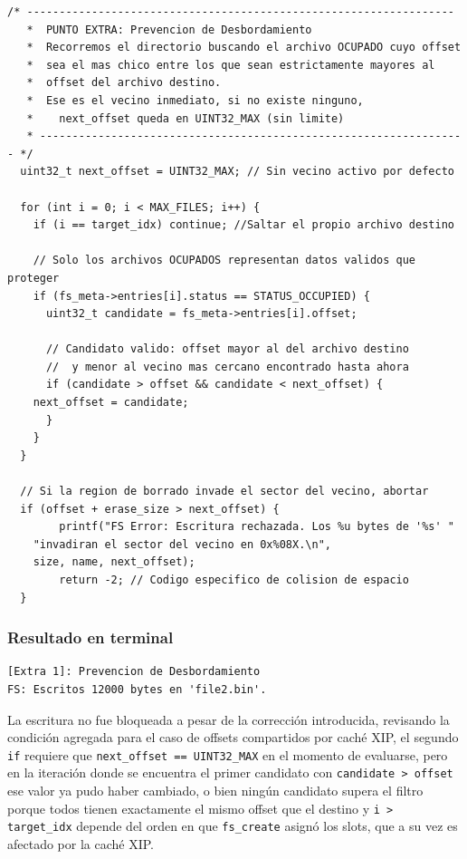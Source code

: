 \documentclass[12pt,letterpaper]{article}
\begin{document}
\begin{lstlisting}[style=modernc, caption={Prevención de desbordamiento en \texttt{fs\_write}: guardia corregida}]
  /* ------------------------------------------------------------------
   *  PUNTO EXTRA: Prevencion de Desbordamiento
   *  Recorremos el directorio buscando el archivo OCUPADO cuyo offset
   *  sea el mas chico entre los que sean estrictamente mayores al
   *  offset del archivo destino.
   *  Ese es el vecino inmediato, si no existe ninguno,
   *    next_offset queda en UINT32_MAX (sin limite)
   * ------------------------------------------------------------------ */
  uint32_t next_offset = UINT32_MAX; // Sin vecino activo por defecto
  
  for (int i = 0; i < MAX_FILES; i++) {
    if (i == target_idx) continue; //Saltar el propio archivo destino
    
    // Solo los archivos OCUPADOS representan datos validos que proteger
    if (fs_meta->entries[i].status == STATUS_OCCUPIED) {
      uint32_t candidate = fs_meta->entries[i].offset;
      
      // Candidato valido: offset mayor al del archivo destino
      //  y menor al vecino mas cercano encontrado hasta ahora
      if (candidate > offset && candidate < next_offset) {
	next_offset = candidate;
      }
    }
  }
  
  // Si la region de borrado invade el sector del vecino, abortar
  if (offset + erase_size > next_offset) {
        printf("FS Error: Escritura rechazada. Los %u bytes de '%s' "
	"invadiran el sector del vecino en 0x%08X.\n",
	size, name, next_offset);
        return -2; // Codigo especifico de colision de espacio
  }
\end{lstlisting}

\bigskip

\subsubsection*{Resultado en terminal}

\begin{Verbatim}[frame=single, fontsize=\footnotesize]
[Extra 1]: Prevencion de Desbordamiento
FS: Escritos 12000 bytes en 'file2.bin'.
\end{Verbatim}

La escritura no fue bloqueada a pesar de la corrección introducida, revisando la condición agregada para el caso
de offsets compartidos por caché XIP, el segundo \texttt{if} requiere que \texttt{next\_offset == UINT32\_MAX} en
el momento de evaluarse, pero en la iteración donde se encuentra el primer candidato con
\texttt{candidate > offset} ese valor ya pudo haber cambiado, o bien ningún candidato supera el filtro porque
todos tienen exactamente el mismo offset que el destino y \texttt{i > target\_idx} depende del orden en que
\texttt{fs\_create} asignó los slots, que a su vez es afectado por la caché XIP.\\
\end{document}
